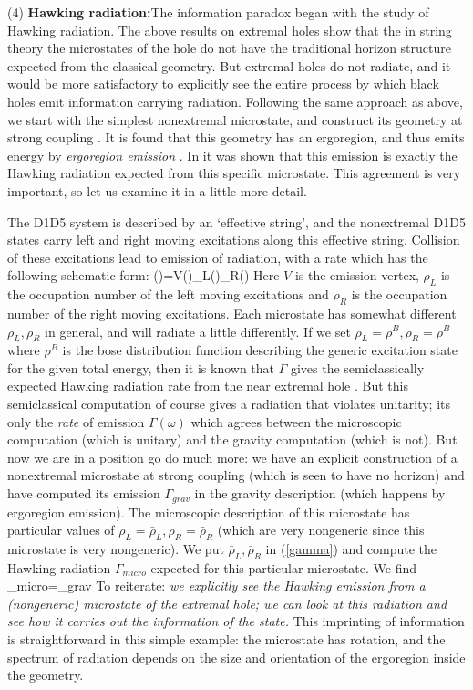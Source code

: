 \documentclass[12pt]{article}
\begin{document}
(4) {\bf Hawking radiation:}\quad The information paradox began with the study of Hawking radiation. The above results on extremal holes show that the in string theory the microstates of the hole do not have the traditional horizon structure expected from the classical geometry. But extremal holes do not radiate, and it would be more satisfactory to explicitly see  the entire process by which black holes emit information carrying radiation. Following the same approach as above, we start with the simplest nonextremal microstate, and construct its geometry at strong coupling \cite{ross}. It is found that this geometry has an ergoregion, and thus emits energy by {\it ergoregion emission} \cite{myers}.   In \cite{chowdhurymathur} it was shown that this emission is exactly the Hawking radiation expected from this specific microstate. This agreement is very important, so let  us examine it in a little more detail. 

The D1D5 system is described by an `effective string', and the nonextremal D1D5 states carry left and right moving excitations along this effective string. Collision of these excitations lead to emission of radiation, with a rate which has the following schematic form:
\be
\Gamma(\omega)=V(\omega)\rho_L(\omega)\rho_R(\omega)
\label{gamma}
\ee
Here $V$ is the emission vertex, $\rho_L$ is the occupation number of the left moving excitations and $\rho_R$ is the occupation number of the right moving excitations. Each microstate has somewhat different $\rho_L, \rho_R$ in general, and will radiate a little differently. If we set $\rho_L=\rho^B, \rho_R=\rho^B$ where $\rho^B$ is the bose distribution function describing the generic excitation state for the given total energy, then it is known that $\Gamma$ gives the semiclassically expected Hawking radiation rate from the near extremal hole \cite{radiationall}. But this semiclassical computation of course gives a radiation that violates unitarity; its only the {\it rate} of emission $\Gamma(\omega)$ which agrees between the microscopic computation (which is unitary) and the gravity computation (which is not). But now we are in a position go do much more: we have an explicit construction of a nonextremal microstate at strong coupling (which is seen to have no horizon) and have computed its emission $\Gamma_{grav}$ in the gravity description (which happens by ergoregion emission). The microscopic description of this  microstate has particular values of $\rho_L=\bar \rho_L, \rho_R=\bar \rho_R$ (which are very nongeneric since this microstate is very nongeneric). We put $\bar\rho_L, \bar \rho_R$ in (\ref{gamma}) and compute the Hawking radiation $\Gamma_{micro}$ expected for this particular microstate. We find \cite{chowdhurymathur}
\be
\Gamma_{micro}=\Gamma_{grav}
\ee
To reiterate: {\it we  explicitly see the Hawking emission from a (nongeneric) microstate of the extremal hole; we can look at this radiation  and see how it carries out the information of the state.} This imprinting of information is straightforward in this simple example: the microstate has rotation, and the spectrum of radiation depends on the size and orientation of the ergoregion inside the geometry.
\end{document}
